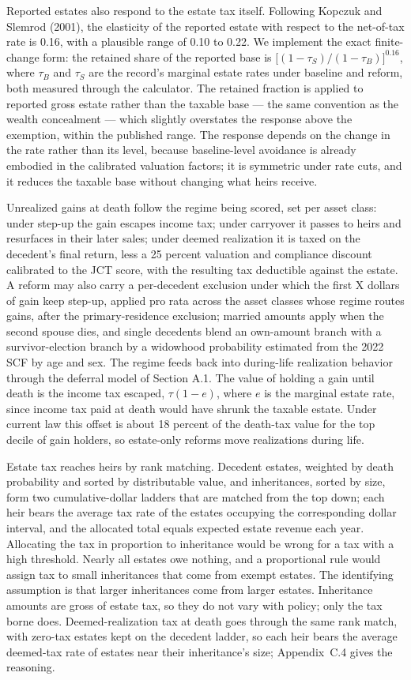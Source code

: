 \documentclass[10pt,twocolumn]{article}
\begin{document}
Reported estates also respond to the estate tax itself. Following Kopczuk and
Slemrod (2001), the elasticity of the reported estate with respect to the
net-of-tax rate is 0.16, with a plausible range of 0.10 to 0.22. We implement
the exact finite-change form: the retained share of the reported base is
$\bigl[(1-\tau_S)/(1-\tau_B)\bigr]^{0.16}$, where $\tau_B$ and $\tau_S$ are
the record's marginal estate rates under baseline and reform, both measured
through the calculator. The retained fraction is applied to reported gross
estate rather than the taxable base --- the same convention as the wealth
concealment --- which slightly overstates the response above the exemption,
within the published range. The response depends on the change in the rate rather than its level, because baseline-level avoidance is already embodied in the
calibrated valuation factors; it is symmetric under rate cuts, and it reduces
the taxable base without changing what heirs receive.

Unrealized gains at death follow the regime being scored, set per asset class:
under step-up the gain escapes income tax; under carryover it passes to heirs
and resurfaces in their later sales; under deemed realization it is taxed on
the decedent's final return, less a 25 percent valuation and compliance
discount calibrated to the JCT score, with the resulting tax deductible
against the estate. A reform may also carry a per-decedent exclusion under
which the first X dollars of gain keep step-up, applied pro rata across the
asset classes whose regime routes gains, after the primary-residence
exclusion; married amounts apply when the second spouse dies, and single
decedents blend an own-amount branch with a survivor-election branch by a
widowhood probability estimated from the 2022 SCF by age and sex. The regime
feeds back into during-life realization
behavior through the deferral model of Section A.1. The value of holding a
gain until death is the income tax escaped, $\tau(1-e)$, where $e$ is the
marginal estate rate, since income tax paid at death would have shrunk the
taxable estate. Under current law this offset is about 18 percent of the
death-tax value for the top decile of gain holders, so estate-only reforms
move realizations during life.

Estate tax reaches heirs by rank matching. Decedent estates, weighted by death
probability and sorted by distributable value, and inheritances, sorted by
size, form two cumulative-dollar ladders that are matched from the top down;
each heir bears the average tax rate of the estates occupying the
corresponding dollar interval, and the allocated total equals expected estate
revenue each year. Allocating the tax in proportion to inheritance would be
wrong for a tax with a high threshold. Nearly all estates owe nothing, and a
proportional rule would assign tax to small inheritances that come from exempt
estates. The identifying assumption is that larger inheritances come from
larger estates. Inheritance amounts are gross of estate tax, so they do not
vary with policy; only the tax borne does. Deemed-realization tax at death
goes through the same rank match, with zero-tax estates kept on the decedent
ladder, so each heir bears the average deemed-tax rate of estates near their
inheritance's size; Appendix~C.4 gives the reasoning.
\end{document}
